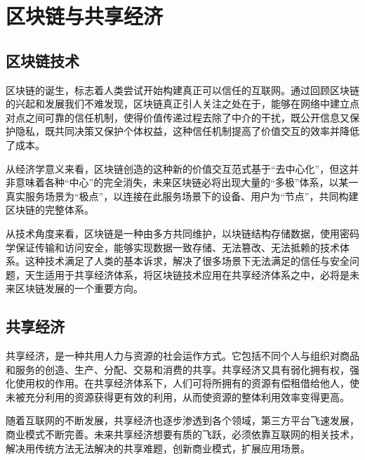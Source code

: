 \chapter{区块链与共享经济}
\section{区块链技术}
区块链的诞生，标志着人类尝试开始构建真正可以信任的互联网。通过回顾区块链的兴起和发展我们不难发现，区块链真正引人关注之处在于，能够在网络中建立点对点之间可靠的信任机制，使得价值传递过程去除了中介的干扰，既公开信息又保护隐私，既共同决策又保护个体权益，这种信任机制提高了价值交互的效率并降低了成本。\par
从经济学意义来看，区块链创造的这种新的价值交互范式基于“去中心化”，但这并非意味着各种“中心”的完全消失，未来区块链必将出现大量的“多极”体系，以某一真实服务场景为“极点”，以连接在此服务场景下的设备、用户为“节点”，共同构建区块链的完整体系。\par
从技术角度来看，区块链是一种由多方共同维护，以块链结构存储数据，使用密码学保证传输和访问安全，能够实现数据一致存储、无法篡改、无法抵赖的技术体系。这种技术满足了人类的基本诉求，解决了很多场景下无法满足的信任与安全问题，天生适用于共享经济体系，将区块链技术应用在共享经济体系之中，必将是未来区块链发展的一个重要方向。
\section{共享经济}
共享经济，是一种共用人力与资源的社会运作方式。它包括不同个人与组织对商品和服务的创造、生产、分配、交易和消费的共享。共享经济又具有弱化拥有权，强化使用权的作用。在共享经济体系下，人们可将所拥有的资源有偿租借给他人，使未被充分利用的资源获得更有效的利用，从而使资源的整体利用效率变得更高。\par 
随着互联网的不断发展，共享经济也逐步渗透到各个领域，第三方平台飞速发展，商业模式不断完善。未来共享经济想要有质的飞跃，必须依靠互联网的相关技术，解决用传统方法无法解决的共享难题，创新商业模式，扩展应用场景。\par 
